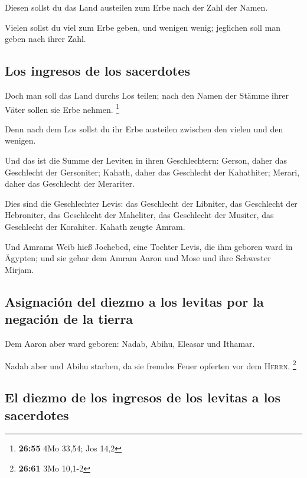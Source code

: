  Diesen sollst du das Land austeilen zum Erbe nach der
Zahl der Namen.

 Vielen sollst du viel zum Erbe geben, und wenigen wenig;
jeglichen soll man geben nach ihrer Zahl.

\hypertarget{los-ingresos-de-los-sacerdotes}{%
\subsection{Los ingresos de los
sacerdotes}\label{los-ingresos-de-los-sacerdotes}}

 Doch man soll das Land durchs Los teilen; nach den Namen
der Stämme ihrer Väter sollen sie Erbe nehmen. \footnote{\textbf{26:55}
  4Mo 33,54; Jos 14,2}

 Denn nach dem Los sollst du ihr Erbe austeilen zwischen
den vielen und den wenigen.

 Und das ist die Summe der Leviten in ihren
Geschlechtern: Gerson, daher das Geschlecht der Gersoniter; Kahath,
daher das Geschlecht der Kahathiter; Merari, daher das Geschlecht der
Merariter.

 Dies sind die Geschlechter Levis: das Geschlecht der
Libniter, das Geschlecht der Hebroniter, das Geschlecht der Maheliter,
das Geschlecht der Musiter, das Geschlecht der Korahiter. Kahath zeugte
Amram.

 Und Amrams Weib hieß Jochebed, eine Tochter Levis, die
ihm geboren ward in Ägypten; und sie gebar dem Amram Aaron und Mose und
ihre Schwester Mirjam.

\hypertarget{asignaciuxf3n-del-diezmo-a-los-levitas-por-la-negaciuxf3n-de-la-tierra}{%
\subsection{Asignación del diezmo a los levitas por la negación de la
tierra}\label{asignaciuxf3n-del-diezmo-a-los-levitas-por-la-negaciuxf3n-de-la-tierra}}

 Dem Aaron aber ward geboren: Nadab, Abihu, Eleasar und
Ithamar.

 Nadab aber und Abihu starben, da sie fremdes Feuer
opferten vor dem \textsc{Herrn}. \footnote{\textbf{26:61} 3Mo 10,1-2}

\hypertarget{el-diezmo-de-los-ingresos-de-los-levitas-a-los-sacerdotes}{%
\subsection{El diezmo de los ingresos de los levitas a los
sacerdotes}\label{el-diezmo-de-los-ingresos-de-los-levitas-a-los-sacerdotes}}

